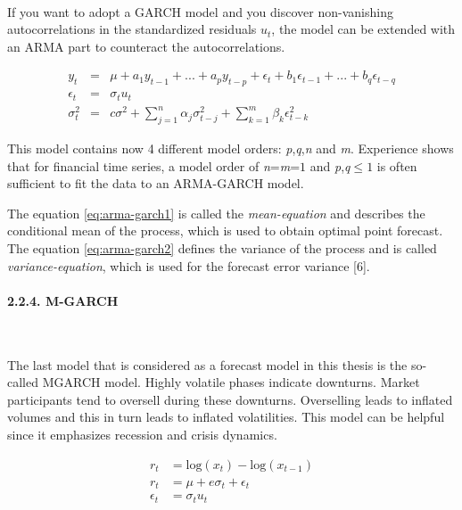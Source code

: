 \documentclass[
]{article}
\begin{document}
~

If you want to adopt a GARCH model and you discover non-vanishing
autocorrelations in the standardized residuals \(\hat{u}_{t}\), the
model can be extended with an ARMA part to counteract the
autocorrelations.

\begin{eqnarray}
y_{t}&=&\mu + a_{1}y_{t-1}+...+a_{p}y_{t-p}+\epsilon_{t}+b_{1}\epsilon_{t-1}+...+b_{q}\epsilon_{t-q} \label{eq:arma-garch1} \\
\epsilon_{t}&=&\sigma_{t}u_{t} \nonumber \\
\sigma_{t}^{2}&=&c\sigma^{2}+\sum_{j=1}^{n}\alpha_{j}\sigma_{t-j}^{2}+\sum_{k=1}^{m}\beta_{k}\epsilon_{t-k}^{2} \label{eq:arma-garch2}
\end{eqnarray}

This model contains now 4 different model orders:
\emph{p},\emph{q},\emph{n} and \emph{m}. Experience shows that for
financial time series, a model order of \emph{n}=\emph{m}=\(1\) and
\emph{p},\emph{q}\(\leq 1\) is often sufficient to fit the data to an
ARMA-GARCH model.

The equation \ref{eq:arma-garch1} is called the \emph{mean-equation} and
describes the conditional mean of the process, which is used to obtain
optimal point forecast. The equation \ref{eq:arma-garch2} defines the
variance of the process and is called \emph{variance-equation}, which is
used for the forecast error variance {[}6{]}.

\newpage

\hypertarget{m-garch}{%
\paragraph{2.2.4. M-GARCH}\label{m-garch}}

~

The last model that is considered as a forecast model in this thesis is
the so-called MGARCH model. Highly volatile phases indicate downturns.
Market participants tend to oversell during these downturns. Overselling
leads to inflated volumes and this in turn leads to inflated
volatilities. This model can be helpful since it emphasizes recession
and crisis dynamics.

\begin{align} \label{eq:mgarch}
  r_{t} &= \mathrm{log}(x_{t})-\mathrm{log}(x_{t-1}) \nonumber \\
  r_{t} &= \mu+e\sigma_{t}+\epsilon_{t} \\
  \epsilon_{t} &= \sigma_{t}u_{t} \nonumber
\end{align}
\end{document}
